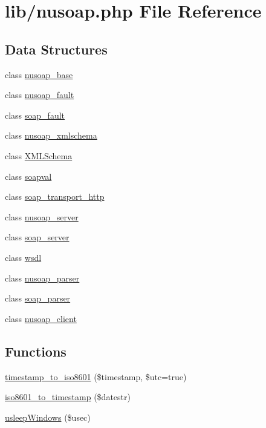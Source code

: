 \hypertarget{nusoap_8php}{}\section{lib/nusoap.php File Reference}
\label{nusoap_8php}
\subsection*{Data Structures}
\begin{DoxyCompactItemize}
\item 
class \hyperlink{classnusoap__base}{nusoap\+\_\+base}
\item 
class \hyperlink{classnusoap__fault}{nusoap\+\_\+fault}
\item 
class \hyperlink{classsoap__fault}{soap\+\_\+fault}
\item 
class \hyperlink{classnusoap__xmlschema}{nusoap\+\_\+xmlschema}
\item 
class \hyperlink{class_x_m_l_schema}{X\+M\+L\+Schema}
\item 
class \hyperlink{classsoapval}{soapval}
\item 
class \hyperlink{classsoap__transport__http}{soap\+\_\+transport\+\_\+http}
\item 
class \hyperlink{classnusoap__server}{nusoap\+\_\+server}
\item 
class \hyperlink{classsoap__server}{soap\+\_\+server}
\item 
class \hyperlink{classwsdl}{wsdl}
\item 
class \hyperlink{classnusoap__parser}{nusoap\+\_\+parser}
\item 
class \hyperlink{classsoap__parser}{soap\+\_\+parser}
\item 
class \hyperlink{classnusoap__client}{nusoap\+\_\+client}
\end{DoxyCompactItemize}
\subsection*{Functions}
\begin{DoxyCompactItemize}
\item 
\hyperlink{nusoap_8php_ae9aac88f9bf83be961dd47d1b78b90d3}{timestamp\+\_\+to\+\_\+iso8601} (\$timestamp, \$utc=true)
\item 
\hyperlink{nusoap_8php_a7458f4fe2e94892e63804807994fb5b9}{iso8601\+\_\+to\+\_\+timestamp} (\$datestr)
\item 
\hyperlink{nusoap_8php_a0405bf74776f57039c31a3f01fd48a29}{usleep\+Windows} (\$usec)
\end{DoxyCompactItemize}
